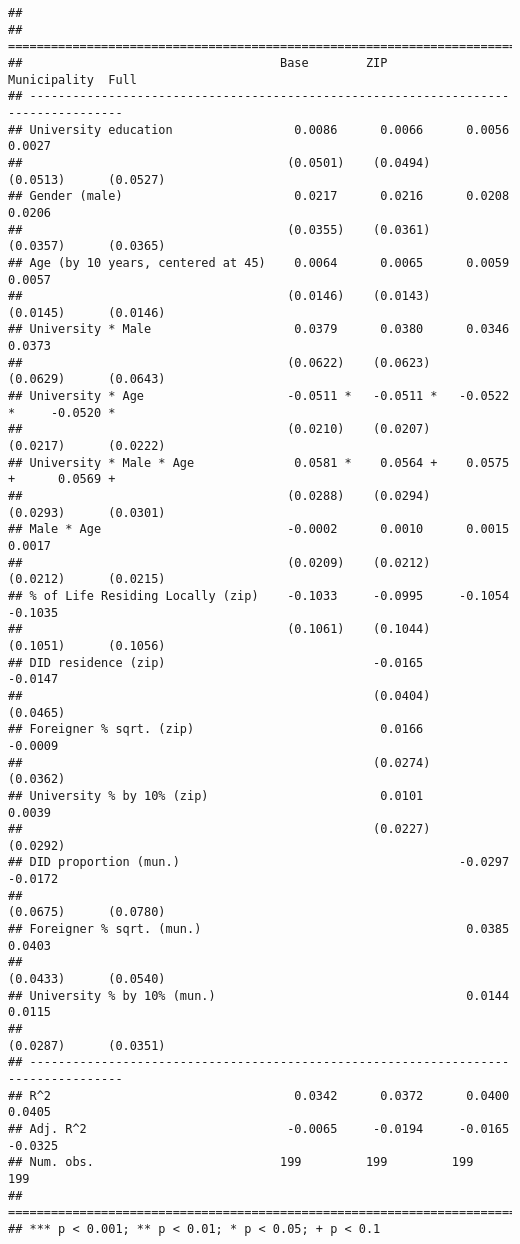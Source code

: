 \documentclass[
]{article}
\begin{document}
\begin{verbatim}
## 
## ===================================================================================
##                                    Base        ZIP         Municipality  Full      
## -----------------------------------------------------------------------------------
## University education                 0.0086      0.0066      0.0056        0.0027  
##                                     (0.0501)    (0.0494)    (0.0513)      (0.0527) 
## Gender (male)                        0.0217      0.0216      0.0208        0.0206  
##                                     (0.0355)    (0.0361)    (0.0357)      (0.0365) 
## Age (by 10 years, centered at 45)    0.0064      0.0065      0.0059        0.0057  
##                                     (0.0146)    (0.0143)    (0.0145)      (0.0146) 
## University * Male                    0.0379      0.0380      0.0346        0.0373  
##                                     (0.0622)    (0.0623)    (0.0629)      (0.0643) 
## University * Age                    -0.0511 *   -0.0511 *   -0.0522 *     -0.0520 *
##                                     (0.0210)    (0.0207)    (0.0217)      (0.0222) 
## University * Male * Age              0.0581 *    0.0564 +    0.0575 +      0.0569 +
##                                     (0.0288)    (0.0294)    (0.0293)      (0.0301) 
## Male * Age                          -0.0002      0.0010      0.0015        0.0017  
##                                     (0.0209)    (0.0212)    (0.0212)      (0.0215) 
## % of Life Residing Locally (zip)    -0.1033     -0.0995     -0.1054       -0.1035  
##                                     (0.1061)    (0.1044)    (0.1051)      (0.1056) 
## DID residence (zip)                             -0.0165                   -0.0147  
##                                                 (0.0404)                  (0.0465) 
## Foreigner % sqrt. (zip)                          0.0166                   -0.0009  
##                                                 (0.0274)                  (0.0362) 
## University % by 10% (zip)                        0.0101                    0.0039  
##                                                 (0.0227)                  (0.0292) 
## DID proportion (mun.)                                       -0.0297       -0.0172  
##                                                             (0.0675)      (0.0780) 
## Foreigner % sqrt. (mun.)                                     0.0385        0.0403  
##                                                             (0.0433)      (0.0540) 
## University % by 10% (mun.)                                   0.0144        0.0115  
##                                                             (0.0287)      (0.0351) 
## -----------------------------------------------------------------------------------
## R^2                                  0.0342      0.0372      0.0400        0.0405  
## Adj. R^2                            -0.0065     -0.0194     -0.0165       -0.0325  
## Num. obs.                          199         199         199           199       
## ===================================================================================
## *** p < 0.001; ** p < 0.01; * p < 0.05; + p < 0.1
\end{verbatim}
\end{document}
